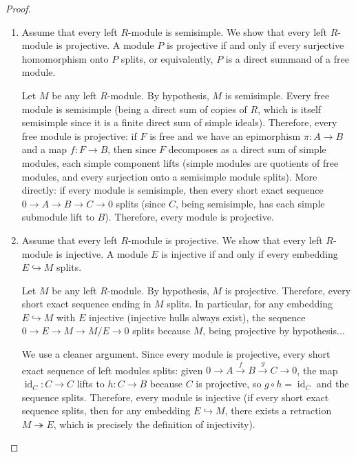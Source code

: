\begin{proof}
\begin{enumerate}
        \item Assume that every left $R$-module is semisimple. We show that every left $R$-module is projective. A module $P$ is projective if and only if every surjective homomorphism onto $P$ splits, or equivalently, $P$ is a direct summand of a free module.

        Let $M$ be any left $R$-module. By hypothesis, $M$ is semisimple. Every free module is semisimple (being a direct sum of copies of $R$, which is itself semisimple since it is a finite direct sum of simple ideals). Therefore, every free module is projective: if $F$ is free and we have an epimorphism $\pi : A \to B$ and a map $f : F \to B$, then since $F$ decomposes as a direct sum of simple modules, each simple component lifts (simple modules are quotients of free modules, and every surjection onto a semisimple module splits). More directly: if every module is semisimple, then every short exact sequence $0 \to A \to B \to C \to 0$ splits (since $C$, being semisimple, has each simple submodule lift to $B$). Therefore, every module is projective.

        \item Assume that every left $R$-module is projective. We show that every left $R$-module is injective. A module $E$ is injective if and only if every embedding $E \hookrightarrow M$ splits.

        Let $M$ be any left $R$-module. By hypothesis, $M$ is projective. Therefore, every short exact sequence ending in $M$ splits. In particular, for any embedding $E \hookrightarrow M$ with $E$ injective (injective hulls always exist), the sequence $0 \to E \to M \to M/E \to 0$ splits because $M$, being projective by hypothesis...

        We use a cleaner argument. Since every module is projective, every short exact sequence of left modules splits: given $0 \to A \xrightarrow{f} B \xrightarrow{g} C \to 0$, the map $\operatorname{id}_C : C \to C$ lifts to $h : C \to B$ because $C$ is projective, so $g \circ h = \operatorname{id}_C$ and the sequence splits. Therefore, every module is injective (if every short exact sequence splits, then for any embedding $E \hookrightarrow M$, there exists a retraction $M \twoheadrightarrow E$, which is precisely the definition of injectivity).


\end{enumerate}
\end{proof}
